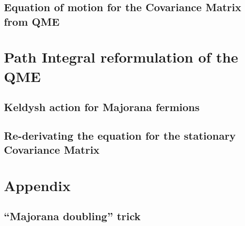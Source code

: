 \documentclass[a4paper,11pt]{article}
\begin{document}
  

  
  
  \subsection{Equation of motion for the Covariance Matrix from QME}
 \section{Path Integral reformulation of the QME}
  \subsection{Keldysh action for Majorana fermions}
  \subsection{Re-derivating the equation for the stationary Covariance Matrix}

  \appendix
  \section*{Appendix}
    \renewcommand{\thesection}{A}
    \subsection{``Majorana doubling'' trick}
    \label{sec:majo_doubling_theory}
    
   
   
{}
  
\end{document}
